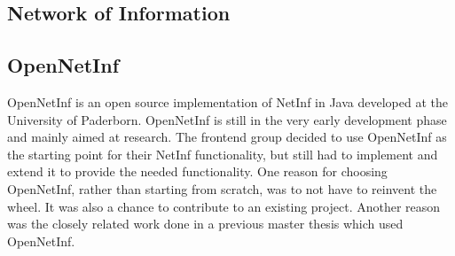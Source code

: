 \subsection{Network of Information}
\subsection{OpenNetInf}

OpenNetInf \cite{opennetinf} is an open source implementation of NetInf in Java developed at the University of Paderborn. OpenNetInf is still in the very early development phase and mainly aimed at research. The frontend group decided to use OpenNetInf as the starting point for their NetInf functionality, but still had to implement and extend it to provide the needed functionality. One reason for choosing OpenNetInf, rather than starting from scratch, was to not have to reinvent the wheel. It was also a chance to contribute to an existing project. Another reason was the closely related work done in a previous master thesis \cite{masterthesis} which used OpenNetInf.

